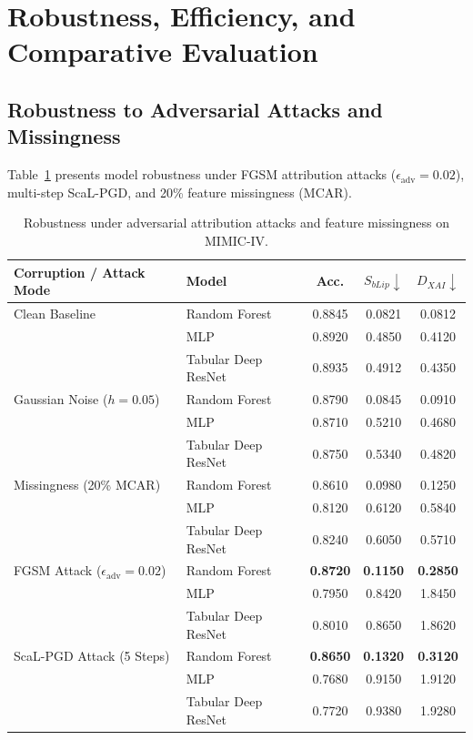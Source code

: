 \documentclass[3p,times,procedia]{elsarticle}
\theoremstyle{definition}
\begin{document}
\section{Robustness, Efficiency, and Comparative Evaluation}

\subsection{Robustness to Adversarial Attacks and Missingness}

Table~\ref{tab:adversarial} presents model robustness under FGSM attribution attacks ($\epsilon_{\mathrm{adv}}=0.02$), multi-step ScaL-PGD, and 20\% feature missingness (MCAR).

\begin{table}[h]
\centering
\small
\caption{Robustness under adversarial attribution attacks and feature missingness on MIMIC-IV.}
\label{tab:adversarial}
\begin{tabular}{llccc}
\toprule
Corruption / Attack Mode & Model & Acc. & $S_{bLip}\downarrow$ & $D_{XAI}\downarrow$ \\
\midrule
Clean Baseline & Random Forest & 0.8845 & 0.0821 & 0.0812 \\
               & MLP & 0.8920 & 0.4850 & 0.4120 \\
               & Tabular Deep ResNet & 0.8935 & 0.4912 & 0.4350 \\
\midrule
Gaussian Noise ($h=0.05$) & Random Forest & 0.8790 & 0.0845 & 0.0910 \\
                          & MLP & 0.8710 & 0.5210 & 0.4680 \\
                          & Tabular Deep ResNet & 0.8750 & 0.5340 & 0.4820 \\
\midrule
Missingness (20\% MCAR)   & Random Forest & 0.8610 & 0.0980 & 0.1250 \\
                          & MLP & 0.8120 & 0.6120 & 0.5840 \\
                          & Tabular Deep ResNet & 0.8240 & 0.6050 & 0.5710 \\
\midrule
FGSM Attack ($\epsilon_{\mathrm{adv}}=0.02$) & Random Forest & \textbf{0.8720} & \textbf{0.1150} & \textbf{0.2850} \\
                                            & MLP & 0.7950 & 0.8420 & 1.8450 \\
                                            & Tabular Deep ResNet & 0.8010 & 0.8650 & 1.8620 \\
\midrule
ScaL-PGD Attack (5 Steps)                   & Random Forest & \textbf{0.8650} & \textbf{0.1320} & \textbf{0.3120} \\
                                            & MLP & 0.7680 & 0.9150 & 1.9120 \\
                                            & Tabular Deep ResNet & 0.7720 & 0.9380 & 1.9280 \\
\bottomrule
\end{tabular}
\end{table}
\end{document}
